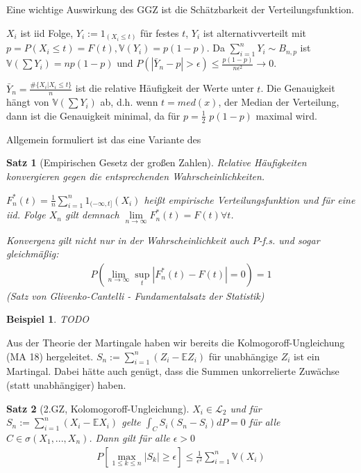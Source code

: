 \documentclass[]{article}
\newtheorem{theorem}{Satz}
\newtheorem*{example}{Beispiel}
\begin{document}
Eine wichtige Auswirkung des GGZ ist die Schätzbarkeit der Verteilungsfunktion.

$X_i$ ist iid Folge, $Y_i:=1_{(X_i \leq t)}$ für festes $t$, $Y_i$ ist alternativverteilt mit $p=P(X_i \leq t) = F(t), \mathbb{V}(Y_i)=p(1-p)$. Da $\sum_{i=1}^{n}Y_i \sim B_{n,p}$ ist $\mathbb{V}(\sum Y_i) = np(1-p)$ und $P(|\bar{Y}_n - p| > \epsilon) \leq \frac{p(1-p)}{n\epsilon^2} \rightarrow 0$.

$\bar{Y}_n = \frac{\#\{X_i|X_i \leq t\}}{n}$ ist die relative Häufigkeit der Werte unter $t$. Die Genauigkeit hängt von $\mathbb{V}(\sum Y_i)$ ab, d.h. wenn $t=med(x)$, der Median der Verteilung, dann ist die Genauigkeit minimal, da für $p=\frac{1}{2}$ $p(1-p)$ maximal wird.

Allgemein formuliert ist das eine Variante des
\begin{theorem}[Empirischen Gesetz der großen Zahlen]
	Relative Häufigkeiten konvergieren gegen die entsprechenden Wahrscheinlichkeiten.
	
	$F_n^*(t)=\frac{1}{n}\sum_{i=1}^{n}1_{(-\infty,t]}(X_i)$ heißt empirische Verteilungsfunktion und für eine iid. Folge $X_n$ gilt demnach $\lim\limits_{n\rightarrow\infty}F_n^*(t)=F(t) \forall t$.
	
	Konvergenz gilt nicht nur in der Wahrscheinlichkeit auch $P$-f.s. und sogar gleichmäßig:
	\begin{align*}
		P(\lim\limits_{n\rightarrow\infty}\sup_t |F_n^*(t)-F(t)|=0) = 1
	\end{align*}
	(Satz von Glivenko-Cantelli - Fundamentalsatz der Statistik)
\end{theorem}

\begin{example}
	TODO
\end{example}

Aus der Theorie der Martingale haben wir bereits die Kolmogoroff-Ungleichung (MA 18) hergeleitet. $S_n := \sum_{i=1}^{n}(Z_i - \mathbb{E}Z_i)$ für unabhängige $Z_i$ ist ein Martingal. Dabei hätte auch genügt, dass die Summen unkorrelierte Zuwächse (statt unabhängiger) haben.

\begin{theorem}[2.GZ, Kolomogoroff-Ungleichung]
	$X_i \in \mathcal{L}_2$ und für $S_n := \sum_{i=1}^{n}(X_i - \mathbb{E}X_i)$ gelte $\int_C S_i(S_n - S_i) dP = 0$ für alle $C \in \sigma(X_1, ..., X_n)$. Dann gilt für alle $\epsilon > 0$
	\begin{align*}
		P[\max_{1\leq k \leq n} |S_k| \geq \epsilon] \leq \frac{1}{\epsilon^2} \sum_{i=1}^{n} \mathbb{V}(X_i)
	\end{align*}
\end{theorem}
\end{document}
